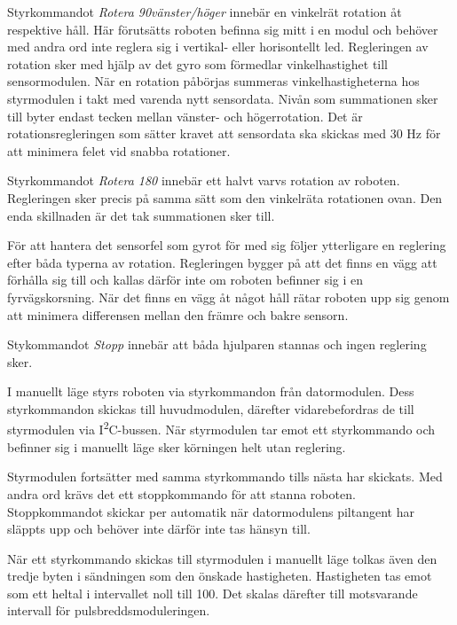 \documentclass[11pt]{article}
\begin{document}
\begin{flushleft}
\begin{description}[style=unboxed, leftmargin=0cm]
Styrkommandot \textit{Rotera 90\textdegree vänster/höger} innebär en vinkelrät rotation åt respektive håll. Här förutsätts roboten befinna sig mitt i en modul och behöver med andra ord inte reglera sig i vertikal- eller horisontellt led. Regleringen av rotation sker med hjälp av det gyro som förmedlar vinkelhastighet till sensormodulen. När en rotation påbörjas summeras vinkelhastigheterna hos styrmodulen i takt med varenda nytt sensordata. Nivån som summationen sker till byter endast tecken mellan vänster- och högerrotation. Det är rotationsregleringen som sätter kravet att sensordata ska skickas med $30$ Hz för att minimera felet vid snabba rotationer. 

Styrkommandot \textit{Rotera 180\textdegree} innebär ett halvt varvs rotation av roboten. Regleringen sker precis på samma sätt som den vinkelräta rotationen ovan. Den enda skillnaden är det tak summationen sker till. 


För att hantera det sensorfel som gyrot för med sig följer ytterligare en reglering efter båda typerna av rotation. Regleringen bygger på att det finns en vägg att förhålla sig till och kallas därför inte om roboten befinner sig i en fyrvägskorsning. När det finns en vägg åt något håll rätar roboten upp sig genom att minimera differensen mellan den främre och bakre sensorn. 

Stykommandot \textit{Stopp} innebär att båda hjulparen stannas och ingen reglering sker. 

\item[Manuellt läge] I manuellt läge styrs roboten via styrkommandon från datormodulen. Dess styrkommandon skickas till huvudmodulen, därefter vidarebefordras de till styrmodulen via I\textsuperscript{2}C-bussen. När styrmodulen tar emot ett styrkommando och befinner sig i manuellt läge sker körningen helt utan reglering. 

  Styrmodulen fortsätter med samma styrkommando tills nästa har skickats. Med andra ord krävs det ett stoppkommando för att stanna roboten. Stoppkommandot skickar per automatik när datormodulens piltangent har släppts upp och behöver inte därför inte tas hänsyn till. 

  När ett styrkommando skickas till styrmodulen i manuellt läge tolkas även den tredje byten i sändningen som den önskade hastigheten. Hastigheten tas emot som ett heltal i intervallet noll till 100. Det skalas därefter till motsvarande intervall för pulsbreddsmoduleringen.

  \end{description}


\end{flushleft}
\end{document}
